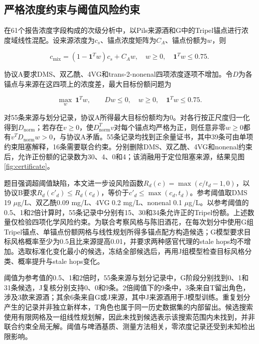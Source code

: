 \documentclass{mathorcup-journal}
\begin{document}
\subsection{严格浓度约束与阈值风险约束}

在61个报告浓度字段构成的次级分析中，以Pils来源酒和G中的Tripel锚点进行浓度域线性混配。设来源浓度为$c_s$、锚点浓度矩阵为$C_A$、锚点份额为$w$，则


\begin{equation}
c_{\mathrm{mix}}=(1-\mathbf1^Tw)c_s+C_Aw,\quad w\ge0,\quad\mathbf1^Tw\le0.75.
\end{equation}

协议A要求DMS、双乙酰、4VG和trans-2-nonenal四项浓度逐项不增加。令$D$为各锚点与来源在这四项上的浓度差，最大目标份额问题为


\begin{equation}
\max_w\ \mathbf1^Tw,\qquad Dw\le0,\quad w\ge0,\quad\mathbf1^Tw\le0.75.
\end{equation}

对55条来源与划分记录，协议A所得最大目标份额均为0。对各行按正尺度归一化得到$D_{\mathrm{norm}}$；若存在$v\ge0$，使$D_{\mathrm{norm}}^Tv$对每个锚点均严格为正，则任意非零$w\ge0$都有$v^TD_{\mathrm{norm}}w>0$，与协议A矛盾。55条记录均找到正余量证书，其中39条可由单项约束阻塞解释，16条需要联合约束。分别删除DMS、双乙酰、4VG和nonenal约束后，允许正份额的记录数为30、4、0和4；该消融用于定位阻塞来源，结果见图\ref{fig:certificate}。


题目强调超阈值缺陷，本文进一步设风险函数$R_d(c)=\max(c/t_d-1,0)$，以协议B要求$R_d(c'_d)\le R_d(c_d)$，等价于$c'_d\le\max(c_d,t_d)$。参考阈值取DMS 19 $\mu$g/L、双乙酰0.09 mg/L、4VG 0.2 mg/L、nonenal 0.1 $\mu$g/L\cite{ref13}\cite{ref14}。以参考阈值的0.5、1和2倍计算时，55条记录中分别有15、30和34条允许正的Tripel份额。上述数量仅检验四项化学风险约束。为联合考察风格与陈旧酒花，在每次划分中使用G组Tripel锚点、单锚点份额网格与线性规划所得多锚点配方构造候选；G模型要求目标风格概率至少为0.5且比来源提高0.01，并要求两种感官代理的stale hops均不增加。选取标准化变化最小的候选，冻结全部候选后，再用J组模型检查目标风格分类、概率提升与stale hops变化。

阈值为参考值的0.5、1和2倍时，55条来源与划分记录中，G阶段分别找到0、1和31条候选，J复核分别支持0、0和9条。2倍阈值下的9条中，3条来自T留出角色，涉及3款来源酒；其余6条来自G或J来源，其中J来源酒用于J模型训练。重复划分产生的记录并非独立新样本，T角色也属于同一历史数据集的内部留出。候选搜索使用有限网格及一组线性规划解，因此未找到候选表示该搜索范围内未找到，并非联合约束全局无解。阈值与啤酒基质、测量方法相关，零浓度记录还受到未知检出限影响。
\end{document}
